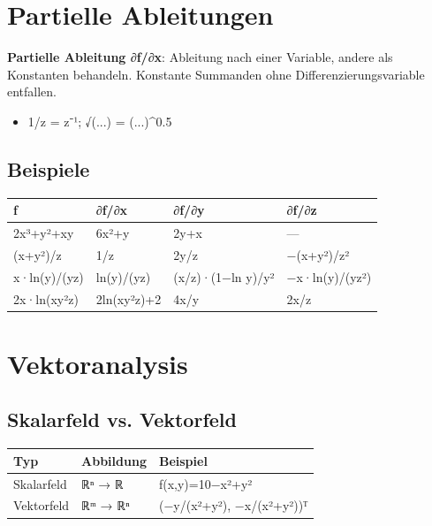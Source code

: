 \documentclass[11pt, a4paper]{article}
\begin{document}
\section{Partielle Ableitungen}

\textbf{Partielle Ableitung ∂f/∂x}: Ableitung nach einer Variable, andere als Konstanten behandeln. Konstante Summanden ohne Differenzierungsvariable entfallen.

\begin{itemize}
  \item 1/z = z⁻¹; √(...) = (...)\textasciicircum{}0.5
\end{itemize}


\subsection{Beispiele}

{\small
\begin{tabularx}{\linewidth}{XXXX}
\hline
\rowcolor{tableheadbg}
{\color{white}\textbf{f}} & {\color{white}\textbf{∂f/∂x}} & {\color{white}\textbf{∂f/∂y}} & {\color{white}\textbf{∂f/∂z}} \\[2pt]
\hline
\endhead
\hline
\endfoot
2x³+y²+xy & 6x²+y & 2y+x & — \\
(x+y²)/z & 1/z & 2y/z & −(x+y²)/z² \\
x·ln(y)/(yz) & ln(y)/(yz) & (x/z)·(1−ln y)/y² & −x·ln(y)/(yz²) \\
2x·ln(xy²z) & 2ln(xy²z)+2 & 4x/y & 2x/z \\
\end{tabularx}
}



\section{Vektoranalysis}


\subsection{Skalarfeld vs. Vektorfeld}

{\small
\begin{tabularx}{\linewidth}{XXX}
\hline
\rowcolor{tableheadbg}
{\color{white}\textbf{Typ}} & {\color{white}\textbf{Abbildung}} & {\color{white}\textbf{Beispiel}} \\[2pt]
\hline
\endhead
\hline
\endfoot
Skalarfeld & ℝⁿ → ℝ & f(x,y)=10−x²+y² \\
Vektorfeld & ℝᵐ → ℝⁿ & (−y/(x²+y²), −x/(x²+y²))ᵀ \\
\end{tabularx}
}
\end{document}
